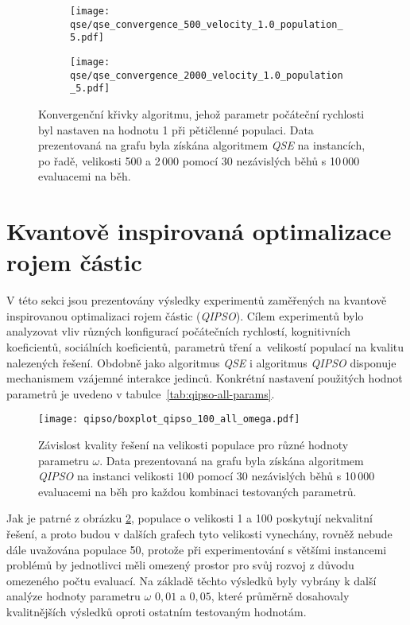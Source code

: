 \begin{figure}[ht!]
    \centering
    \begin{subfigure}[b]{0.48\textwidth}
      \texttt{[image: qse/qse\_convergence\_500\_velocity\_1.0\_population\_5.pdf]}
    \end{subfigure}
    \hfill
    \begin{subfigure}[b]{0.48\textwidth}
        \texttt{[image: qse/qse\_convergence\_2000\_velocity\_1.0\_population\_5.pdf]}
    \end{subfigure}
    \caption{Konvergenční křivky algoritmu, jehož parametr počáteční rychlosti byl nastaven na hodnotu 1 při pětičlenné populaci. Data prezentovaná na grafu byla získána algoritmem \emph{QSE} na instancích, po řadě, velikosti 500 a 2\,000 pomocí 30 nezávislých běhů s 10\,000 evaluacemi na běh.}
    \label{fig:qse-convergence}
\end{figure}

\section{Kvantově inspirovaná optimalizace rojem částic}\label{sec:exp-qipso}
V této sekci jsou prezentovány výsledky experimentů zaměřených na kvantově inspirovanou optimalizaci rojem částic (\emph{QIPSO}). 
Cílem experimentů bylo analyzovat vliv různých konfigurací počátečních rychlostí, kognitivních koeficientů, sociálních koeficientů, parametrů tření a~velikostí populací na kvalitu nalezených řešení. 
Obdobně jako algoritmus \emph{QSE} i algoritmus \emph{QIPSO} disponuje mechanismem vzájemné interakce jedinců. 
Konkrétní nastavení použitých hodnot parametrů je uvedeno v tabulce~\ref{tab:qipso-all-params}. 

\begin{figure}[ht!]
    \centering
    \texttt{[image: qipso/boxplot\_qipso\_100\_all\_omega.pdf]}
    \caption{Závislost kvality řešení na velikosti populace pro různé hodnoty parametru $\omega$. Data prezentovaná na grafu byla získána algoritmem \emph{QIPSO} na instanci velikosti 100 pomocí 30 nezávislých běhů s 10\,000 evaluacemi na běh pro každou kombinaci testovaných parametrů.}
    \label{fig:qipso-100-all-omega}
\end{figure}

Jak je patrné z obrázku \ref{fig:qipso-100-all-omega}, populace o velikosti 1 a 100 poskytují nekvalitní řešení, a proto budou v dalších grafech tyto velikosti vynechány, rovněž nebude dále uvažována populace 50, protože při experimentování s většími instancemi problémů by jednotlivci měli omezený prostor pro svůj rozvoj z důvodu omezeného počtu evaluací. 
Na základě těchto výsledků byly vybrány k další analýze hodnoty parametru $\omega$ $0{,}01$ a $0{,}05$, které průměrně dosahovaly kvalitnějších výsledků oproti ostatním testovaným hodnotám.

